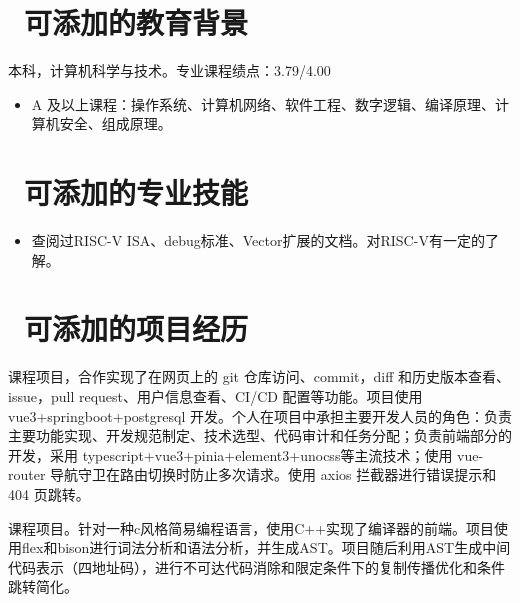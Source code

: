 \newpage

\section{\faGraduationCap\  可添加的教育背景}
本科，计算机科学与技术。专业课程绩点：3.79/4.00
\begin{itemize}[parsep=0.5ex]
  \item A 及以上课程：操作系统、计算机网络、软件工程、数字逻辑、编译原理、计算机安全、组成原理。
\end{itemize}

\section{\faBook\ 可添加的专业技能}
\begin{itemize}[parsep=0.5ex]
    \item 查阅过RISC-V ISA、debug标准、Vector扩展的文档。对RISC-V有一定的了解。
\end{itemize}

\section{\faCogs\ 可添加的项目经历}


\begin{onehalfspacing}
  课程项目，合作实现了在网页上的 git 仓库访问、commit，diff 和历史版本查看、issue，pull request、用户信息查看、CI/CD 配置等功能。项目使用 vue3+springboot+postgresql 开发。个人在项目中承担主要开发人员的角色：负责主要功能实现、开发规范制定、技术选型、代码审计和任务分配；负责前端部分的开发，采用 typescript+vue3+pinia+element3+unocss等主流技术；使用 vue-router 导航守卫在路由切换时防止多次请求。使用 axios 拦截器进行错误提示和 404 页跳转。
  \end{onehalfspacing}

\begin{onehalfspacing}
  课程项目。针对一种c风格简易编程语言，使用C++实现了编译器的前端。项目使用flex和bison进行词法分析和语法分析，并生成AST。项目随后利用AST生成中间代码表示（四地址码），进行不可达代码消除和限定条件下的复制传播优化和条件跳转简化。

\end{onehalfspacing}

